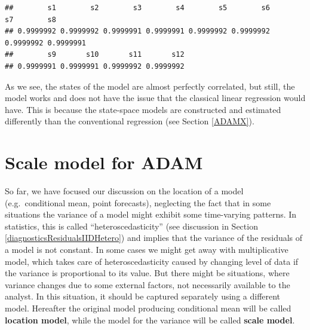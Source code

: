 \documentclass[
]{book}
\newenvironment{Shaded}{\begin{snugshade}}{\end{snugshade}}
\newcommand{\CommentTok}[1]{\textcolor[rgb]{0.56,0.35,0.01}{\textit{#1}}}
\newcommand{\DecValTok}[1]{\textcolor[rgb]{0.00,0.00,0.81}{#1}}
\newcommand{\FunctionTok}[1]{\textcolor[rgb]{0.00,0.00,0.00}{#1}}
\newcommand{\NormalTok}[1]{#1}
\newcommand{\OtherTok}[1]{\textcolor[rgb]{0.56,0.35,0.01}{#1}}
\newcommand{\SpecialCharTok}[1]{\textcolor[rgb]{0.00,0.00,0.00}{#1}}
\newcommand{\StringTok}[1]{\textcolor[rgb]{0.31,0.60,0.02}{#1}}
\theoremstyle{definition}
\theoremstyle{definition}
\theoremstyle{definition}
\theoremstyle{definition}
\theoremstyle{remark}
\begin{document}
\begin{Shaded}
\end{Shaded}

\begin{verbatim}
##        s1        s2        s3        s4        s5        s6        s7        s8 
## 0.9999992 0.9999992 0.9999991 0.9999991 0.9999992 0.9999992 0.9999992 0.9999991 
##        s9       s10       s11       s12 
## 0.9999991 0.9999991 0.9999992 0.9999992
\end{verbatim}

As we see, the states of the model are almost perfectly correlated, but still, the model works and does not have the issue that the classical linear regression would have. This is because the state-space models are constructed and estimated differently than the conventional regression (see Section \ref{ADAMX}).

\hypertarget{ADAMscaleModel}{%
\chapter{Scale model for ADAM}\label{ADAMscaleModel}}

So far, we have focused our discussion on the location of a model (e.g.~conditional mean, point forecasts), neglecting the fact that in some situations the variance of a model might exhibit some time-varying patterns. In statistics, this is called ``heteroscedasticity'' (see discussion in Section \ref{diagnosticsResidualsIIDHetero}) and implies that the variance of the residuals of a model is not constant. In some cases we might get away with multiplicative model, which takes care of heteroscedasticity caused by changing level of data if the variance is proportional to its value. But there might be situations, where variance changes due to some external factors, not necessarily available to the analyst. In this situation, it should be captured separately using a different model. Hereafter the original model producing conditional mean will be called \textbf{location model}, while the model for the variance will be called \textbf{scale model}.
\end{document}
